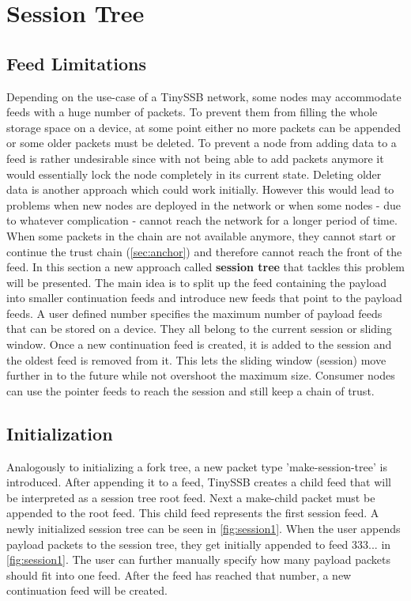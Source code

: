 \section{Session Tree}
\label{sec:session}
\subsection{Feed Limitations}
\label{sec:sessionlimit}
Depending on the use-case of a TinySSB network, some nodes may accommodate feeds with a huge number of packets. To prevent them from filling the whole storage space on a device, at some point either no more packets can be appended or some older packets must be deleted. To prevent a node from adding data to a feed is rather undesirable since with not being able to add packets anymore it would essentially lock the node completely in its current state. Deleting older data is another approach which could work initially. However this would lead to problems when new nodes are deployed in the network or when some nodes - due to whatever complication - cannot reach the network for a longer period of time. When some packets in the chain are not available anymore, they cannot start or continue the trust chain (\cref{sec:anchor}) and therefore cannot reach the front of the feed. In this section a new approach called \textbf{session tree} that tackles this problem will be presented. The main idea is to split up the feed containing the payload into smaller continuation feeds and introduce new feeds that point to the payload feeds. A user defined number specifies the maximum number of payload feeds that can be stored on a device. They all belong to the current session or sliding window. Once a new continuation feed is created, it is added to the session and the oldest feed is removed from it. This lets the sliding window (session) move further in to the future while not overshoot the maximum size. Consumer nodes can use the pointer feeds to reach the session and still keep a chain of trust.

\subsection{Initialization}
Analogously to initializing a fork tree, a new packet type 'make-session-tree' is introduced. After appending it to a feed, TinySSB creates a child feed that will be interpreted as a session tree root feed. Next a make-child packet must be appended to the root feed. This child feed represents the first session feed. A newly initialized session tree can be seen in \cref{fig:session1}. When the user appends payload packets to the session tree, they get initially appended to feed 333... in \cref{fig:session1}. The user can further manually specify how many payload packets should fit into one feed. After the feed has reached that number, a new continuation feed will be created. 

